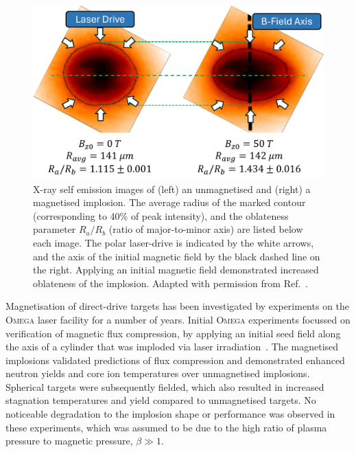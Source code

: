 \begin{figure}[t!]
    \includegraphics[width=0.6\linewidth]{Results2/Images/MagP2_Bose.png}
    \centering
    \caption{X-ray self emission images of (left) an unmagnetised and (right) a magnetised implosion.
    The average radius of the marked contour (corresponding to 40\% of peak intensity), and the oblateness parameter $R_a/R_b$ (ratio of major-to-minor axis) are listed below each image.
    The polar laser-drive is indicated by the white arrows, and the axis of the initial magnetic field by the black dashed line on the right.
    Applying an initial magnetic field demonstrated increased oblateness of the implosion.
    Adapted with permission from Ref.~\cite{bose_effect_2022}.}%
    \label{fig:Res2_Bose_magp2}
\end{figure}

Magnetisation of direct-drive targets has been investigated by experiments on the \textsc{Omega} laser facility for a number of years.
Initial \textsc{Omega} experiments focussed on verification of magnetic flux compression, by applying an initial seed field along the axis of a cylinder that was imploded via laser irradiation~\cite{gotchev_laser-driven_2009}.
The magnetised implosions validated predictions of flux compression and demonstrated enhanced neutron yields and core ion temperatures over unmagnetised implosions.
Spherical targets were subsequently fielded, which also resulted in increased stagnation temperatures and yield compared to unmagnetised targets.
No noticeable degradation to the implosion shape or performance was observed in these experiments, which was assumed to be due to the high ratio of plasma pressure to magnetic pressure, $\beta\gg 1$.

